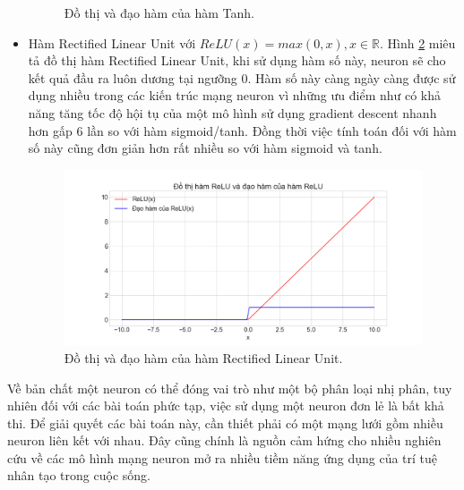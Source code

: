 \begin{itemize}
\begin{figure}[ht!]
  		\caption{Đồ thị và đạo hàm của hàm Tanh.}
  		\label{fig:tanh}
	\end{figure}
	\item Hàm Rectified Linear Unit với $ReLU(x) = max(0,x), x \in \mathbb{R}$. Hình \ref{fig:relu} miêu tả đồ thị hàm Rectified Linear Unit, khi sử dụng hàm số này, neuron sẽ cho kết quả đầu ra luôn dương tại ngưỡng $0$. Hàm số này càng ngày càng được sử dụng nhiều trong các kiến trúc mạng neuron vì những ưu điểm như có khả năng tăng tốc độ hội tụ của một mô hình sử dụng gradient descent nhanh hơn gấp $6$ lần\cite{alexetal:2012} so với hàm sigmoid/tanh. Đồng thời việc tính toán đối với hàm số này cũng đơn giản hơn rất nhiều so với hàm sigmoid và tanh.
	\begin{figure}[ht!]
		\centerline{\includegraphics[scale=0.4]{images/relu.png}}
  		\caption{Đồ thị và đạo hàm của hàm Rectified Linear Unit.}
  		\label{fig:relu}
	\end{figure}
\end{itemize}

Về bản chất một neuron có thể đóng vai trò như một bộ phân loại nhị phân, tuy nhiên đối với các bài toán phức tạp, việc sử dụng một neuron đơn lẻ là bất khả thi. Để giải quyết các bài toán này, cần thiết phải có một mạng lưới gồm nhiều neuron liên kết với nhau. Đây cũng chính là nguồn cảm hứng cho nhiều nghiên cứu về các mô hình mạng neuron mở ra nhiều tiềm năng ứng dụng của trí tuệ nhân tạo trong cuộc sống.
